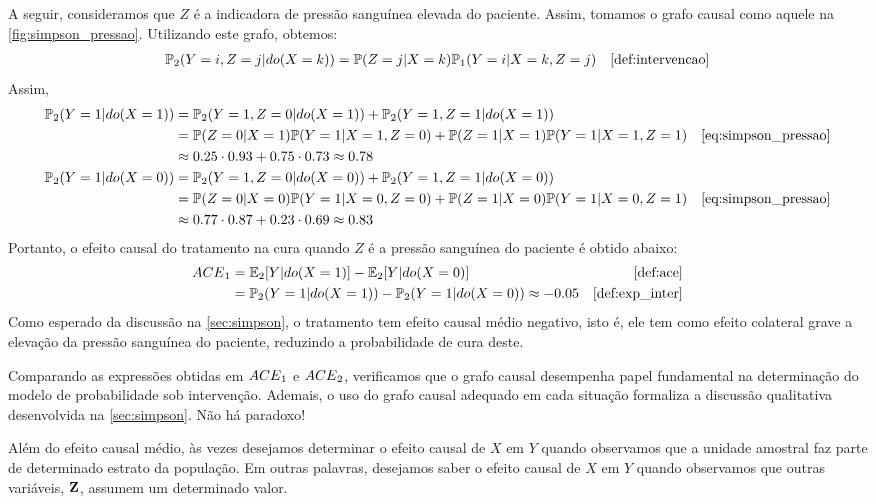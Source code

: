 \begin{example}
 A seguir, consideramos que $Z$ é
 a indicadora de pressão sanguínea elevada do paciente.
 Assim, tomamos o grafo causal como 
 aquele na \cref{fig:simpson_pressao}.
 Utilizando este grafo, obtemos:
 \begin{align}
  \label{eq:simpson_pressao}
  \P_2(Y=i,Z=j|do(X=k))
  &= \P(Z=j|X=k)\P_1(Y=i|X=k,Z=j) 
  & \text{\cref{def:intervencao}}
 \end{align}
 Assim,
 \begin{align*}
  \P_2(Y=1|do(X=1))
  &= \P_2(Y=1,Z=0|do(X=1)) + \P_2(Y=1,Z=1|do(X=1)) \\
  &= \P(Z=0|X=1)\P(Y=1|X=1,Z=0) + \P(Z=1|X=1)\P(Y=1|X=1,Z=1)
  & \text{\cref{eq:simpson_pressao}} \\
  &\approx 0.25 \cdot 0.93 + 0.75 \cdot 0.73 \approx 0.78 \\
  \P_2(Y=1|do(X=0))
  &= \P_2(Y=1,Z=0|do(X=0)) + \P_2(Y=1,Z=1|do(X=0)) \\
  &= \P(Z=0|X=0)\P(Y=1|X=0,Z=0) + \P(Z=1|X=0)\P(Y=1|X=0,Z=1)
  & \text{\cref{eq:simpson_pressao}} \\
  &\approx 0.77 \cdot 0.87 + 0.23 \cdot 0.69 \approx 0.83 \\
 \end{align*}
 Portanto, o efeito causal do tratamento na cura quando
 $Z$ é a pressão sanguínea do paciente é obtido abaixo:
 \begin{align*}
  \ACE_1 &= \E_2[Y|do(X=1)] - \E_2[Y|do(X=0)] 
  & \text{\cref{def:ace}} \\
  &= \P_2(Y=1|do(X=1)) - \P_2(Y=1|do(X=0)) \approx -0.05
  & \text{\cref{def:exp_inter}}
 \end{align*}
 Como esperado da discussão na \cref{sec:simpson},
 o tratamento tem efeito causal médio negativo, isto é,
 ele tem como efeito colateral grave a
 elevação da pressão sanguínea do paciente,
 reduzindo a probabilidade de cura deste.
 
 Comparando as expressões obtidas em ${ACE}_1$ e ${ACE}_2$,
 verificamos que o grafo causal desempenha papel fundamental
 na determinação do modelo de probabilidade sob intervenção.
 Ademais, o uso do grafo causal adequado em cada situação formaliza
 a discussão qualitativa desenvolvida na \cref{sec:simpson}.
 Não há paradoxo!
\end{example}

Além do efeito causal médio, 
às vezes desejamos determinar 
o efeito causal de $X$ em $Y$ quando
observamos que a unidade amostral
faz parte de determinado estrato da população.
Em outras palavras, desejamos saber 
o efeito causal de $X$ em $Y$ quando observamos que
outras variáveis, ${\mathbf{Z}}$, assumem um determinado valor.

